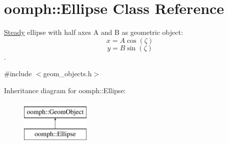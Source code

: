 \hypertarget{classoomph_1_1Ellipse}{}\section{oomph\+:\+:Ellipse Class Reference}
\label{classoomph_1_1Ellipse}


\hyperlink{classoomph_1_1Steady}{Steady} ellipse with half axes A and B as geometric object\+: \[ x = A \cos(\zeta) \] \[ y = B \sin(\zeta) \].  




{\ttfamily \#include $<$geom\+\_\+objects.\+h$>$}

Inheritance diagram for oomph\+:\+:Ellipse\+:\begin{figure}[H]
\begin{center}
\leavevmode
\includegraphics[height=2.000000cm]{classoomph_1_1Ellipse}
\end{center}
\end{figure}
